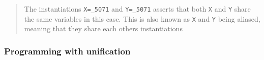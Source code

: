 \begin{Shaded}
\begin{Highlighting}[]
 \KeywordTok{=}\KeywordTok{,}\NormalTok{)}
\KeywordTok{=}
\end{Highlighting}
\end{Shaded}

\begin{Shaded}
\begin{Highlighting}[]
 \KeywordTok{=}\NormalTok{(}\KeywordTok{,}\NormalTok{)}
\KeywordTok{=}
\KeywordTok{=}
\end{Highlighting}
\end{Shaded}

\begin{quote}
The instantiations \texttt{X=\_5071} and \texttt{Y=\_5071} asserts that
both \texttt{X} and \texttt{Y} share the same variables in this case.
This is also known as \texttt{X} and \texttt{Y} being aliased, meaning
that they share each others instantiations
\end{quote}

\begin{Shaded}
\begin{Highlighting}[]
 \KeywordTok{=}\NormalTok{)}\KeywordTok{,}
\KeywordTok{=}
\end{Highlighting}
\end{Shaded}

\begin{Shaded}
\begin{Highlighting}[]
 \KeywordTok{=}\NormalTok{)}\KeywordTok{,}\NormalTok{)}\KeywordTok{,}\KeywordTok{,}
\KeywordTok{=}
\KeywordTok{=}\NormalTok{)}
\end{Highlighting}
\end{Shaded}

\subsubsection{Programming with
unification}\label{logic-programming-paradigm.md__programming-with-unification}

